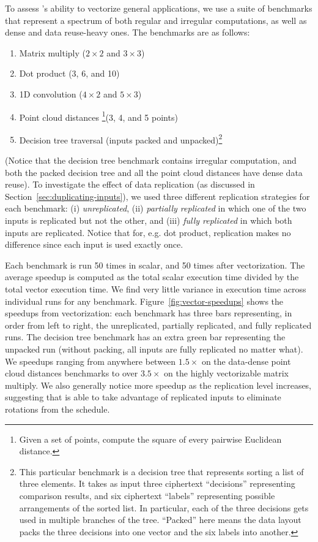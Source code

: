 To assess \system's ability to vectorize general applications, we use a suite of benchmarks that represent a spectrum of both regular and irregular computations, as well as dense and data reuse-heavy ones.
The benchmarks are as follows:
\begin{enumerate}
    \item Matrix multiply ($2\times 2$ and $3\times 3$)
    \item Dot product (3, 6, and 10)
    \item 1D convolution ($4\times 2$ and $5\times 3$)
    \item Point cloud distances \footnote{Given a set of points, compute the square of every pairwise Euclidean distance.}(3, 4, and 5 points)
    \item Decision tree traversal (inputs packed and unpacked)\footnote{This particular benchmark is a decision tree that represents sorting a list of three elements. It takes as input three ciphertext ``decisions'' representing comparison results, and six ciphertext ``labels'' representing possible arrangements of the sorted list. In particular, each of the three decisions gets used in multiple branches of the tree. ``Packed'' here means the data layout packs the three decisions into one vector and the six labels into another. }
\end{enumerate}

(Notice that the decision tree benchmark contains irregular computation, and both the packed decision tree and all the point cloud distances have dense data reuse).
To investigate the effect of data replication (as discussed in Section~\ref{sec:duplicating-inputs}), we used three different replication strategies for each benchmark: (i) {\em unreplicated}, (ii) {\em partially replicated} in which one of the two inputs is replicated but not the other, and (iii) {\em fully replicated} in which both inputs are replicated.
Notice that for, e.g. dot product, replication makes no difference since each input is used exactly once.

Each benchmark is run 50 times in scalar, and 50 times after vectorization. 
The average speedup is computed as the total scalar execution time divided by the total vector execution time.
We find very little variance in execution time across individual runs for any benchmark.
Figure~\ref{fig:vector-speedups} shows the speedups from vectorization: each benchmark has three bars representing, in order from left to right, the unreplicated, partially replicated, and fully replicated runs. 
The decision tree benchmark has an extra green bar representing the unpacked run (without packing, all inputs are fully replicated no matter what).
We speedups ranging from anywhere between $1.5\times$ on the data-dense point cloud distances benchmarks to over $3.5\times$ on the highly vectorizable matrix multiply.
We also generally notice more speedup as the replication level increases, suggesting that \system is able to take advantage of replicated inputs to eliminate rotations from the schedule.


